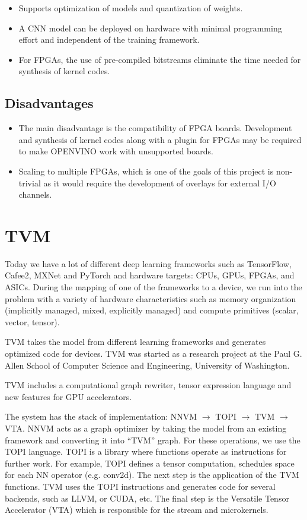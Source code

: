\documentclass[titlepage]{report}
\begin{document}
 \begin{itemize}
 \item Supports optimization of models and quantization of weights.
 \item A CNN model can be deployed on hardware with minimal programming effort and independent of the training framework.
 \item For FPGAs, the use of pre-compiled bitstreams eliminate the time needed for synthesis of kernel codes.
 \end{itemize}
 
 \subsection{Disadvantages}
 \begin{itemize}
 \item The main disadvantage is the compatibility of FPGA boards. Development and synthesis of kernel codes along with a plugin for FPGAs may be required to make OPENVINO work with unsupported boards. 
 \item Scaling to multiple FPGAs, which is one of the goals of this project is non-trivial as it would require the development of overlays for external I/O channels. 
 \end{itemize}
\section{TVM}

Today we have a lot of different deep learning frameworks such as TensorFlow, Cafee2, MXNet and PyTorch and hardware targets: CPUs, GPUs, FPGAs, and ASICs. During the mapping of one of the frameworks to a device, we run into the problem with a variety of hardware characteristics such as memory organization (implicitly managed, mixed, explicitly managed) and compute primitives (scalar, vector, tensor).

TVM takes the model from different learning frameworks and generates optimized code for devices. TVM was started as a research project at the Paul G. Allen School of Computer Science and Engineering, University of Washington.

TVM includes a computational graph rewriter, tensor expression language and new features for GPU accelerators.

The system has the stack of implementation: NNVM $\to$ TOPI $\to$ TVM $\to$ VTA. NNVM acts as a graph optimizer by taking the model from an existing framework and converting it into “TVM” graph. For these operations, we use the TOPI language. TOPI is a library where functions operate as instructions for further work. For example, TOPI defines a tensor computation, schedules space for each NN operator (e.g. conv2d). The next step is the application of the TVM functions. TVM uses the TOPI instructions and generates code for several backends, such as LLVM, or CUDA, etc. The final step is the Versatile Tensor Accelerator (VTA) which is responsible for the stream and microkernels. 
\end{document}
